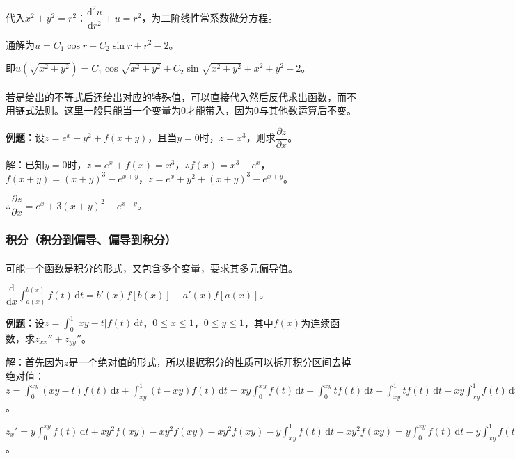 代入$x^2+y^2=r^2$：$\dfrac{\textrm{d}^2u}{\textrm{d}r^2}+u=r^2$，为二阶线性常系数微分方程。

通解为$u=C_1\cos r+C_2\sin r+r^2-2$。

即$u(\sqrt{x^2+y^2})=C_1\cos\sqrt{x^2+y^2}+C_2\sin\sqrt{x^2+y^2}+x^2+y^2-2$。

\paragraph{} \leavevmode \medskip

若是给出的不等式后还给出对应的特殊值，可以直接代入然后反代求出函数，而不用链式法则。这里一般只能当一个变量为0才能带入，因为0与其他数运算后不变。

\textbf{例题：}设$z=e^x+y^2+f(x+y)$，且当$y=0$时，$z=x^3$，则求$\dfrac{\partial z}{\partial x}$。

解：已知$y=0$时，$z=e^x+f(x)=x^3$，$\therefore f(x)=x^3-e^x$，$f(x+y)=(x+y)^3-e^{x+y}$，$z=e^x+y^2+(x+y)^3-e^{x+y}$。

$\therefore\dfrac{\partial z}{\partial x}=e^x+3(x+y)^2-e^{x+y}$。

\subsubsection{积分（积分到偏导、偏导到积分）}

\paragraph{} \leavevmode \medskip

可能一个函数是积分的形式，又包含多个变量，要求其多元偏导值。

$\dfrac{\textrm{d}}{\textrm{d}x}\int_{a(x)}^{b(x)}f(t)\,\textrm{d}t=b'(x)f[b(x)]-a'(x)f[a(x)]$。\medskip

\textbf{例题：}设$z=\int_0^1\vert xy-t\vert f(t)\,\textrm{d}t$，$0\leqslant x\leqslant1$，$0\leqslant y\leqslant1$，其中$f(x)$为连续函数，求$z_{xx}''+z_{yy}''$。

解：首先因为$z$是一个绝对值的形式，所以根据积分的性质可以拆开积分区间去掉绝对值：$z=\int_0^{xy}(xy-t)f(t)\,\textrm{d}t+\int_{xy}^1(t-xy)f(t)\,\textrm{d}t=xy\int_0^{xy}f(t)\,\textrm{d}t-\int_0^{xy}tf(t)\,\textrm{d}t+\int_{xy}^1tf(t)\,\textrm{d}t-xy\int_{xy}^1f(t)\,\textrm{d}t$。

$z_x'=y\int_0^{xy}f(t)\,\textrm{d}t+xy^2f(xy)-xy^2f(xy)-xy^2f(xy)-y\int_{xy}^1f(t)\,\textrm{d}t+xy^2f(xy)=y\int_0^{xy}f(t)\,\textrm{d}t-y\int_{xy}^1f(t)\,\textrm{d}t$。

